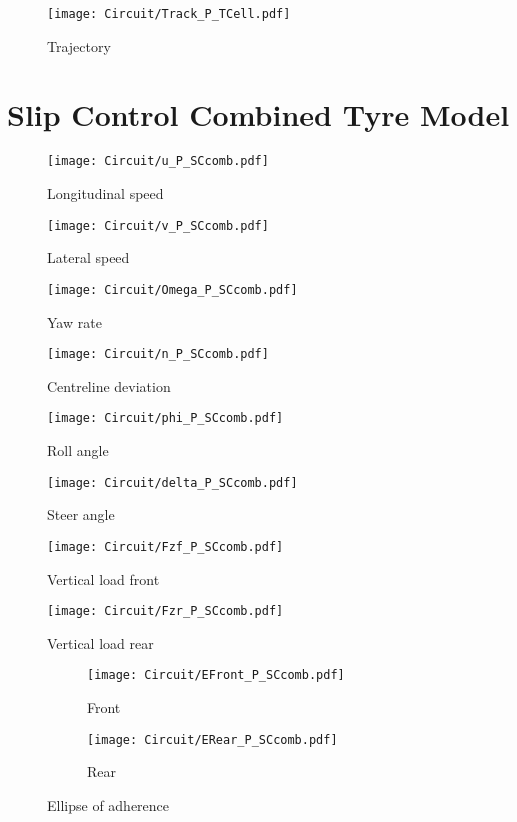 %
%
\begin{figure}[!h]
    \centering
    \texttt{[image: Circuit/Track\_P\_TCell.pdf]}
    \caption{Trajectory}
    \label{fig:TrajTCE}
\end{figure}
%
\clearpage
%
\section{Slip Control Combined Tyre Model}
%
\begin{figure}[!h]
    \centering
    \texttt{[image: Circuit/u\_P\_SCcomb.pdf]}
    \caption{Longitudinal speed}
    \label{fig:uSCC}
\end{figure}
%
\begin{figure}[!h]
    \centering
    \texttt{[image: Circuit/v\_P\_SCcomb.pdf]}
    \caption{Lateral speed}
    \label{fig:vSCC}
\end{figure}
%
\begin{figure}[!h]
    \centering
    \texttt{[image: Circuit/Omega\_P\_SCcomb.pdf]}
    \caption{Yaw rate}
    \label{fig:OmegaSCC}
\end{figure}
%
\begin{figure}[!h]
    \centering
    \texttt{[image: Circuit/n\_P\_SCcomb.pdf]}
    \caption{Centreline deviation}
    \label{fig:nSCC}
\end{figure}
%
\begin{figure}[!h]
    \centering
    \texttt{[image: Circuit/phi\_P\_SCcomb.pdf]}
    \caption{Roll angle}
    \label{fig:phiSCC}
\end{figure}
%
\begin{figure}[!h]
    \centering
    \texttt{[image: Circuit/delta\_P\_SCcomb.pdf]}
    \caption{Steer angle}
    \label{fig:deltaSCC}
\end{figure}
%
\begin{figure}[!h]
    \centering
    \texttt{[image: Circuit/Fzf\_P\_SCcomb.pdf]}
    \caption{Vertical load front}
    \label{fig:FZFSCC}
\end{figure}
%
\begin{figure}[!h]
    \centering
    \texttt{[image: Circuit/Fzr\_P\_SCcomb.pdf]}
    \caption{Vertical load rear}
    \label{fig:FZFSCC}
\end{figure}
%
\begin{figure}[!h]
    \begin{subfigure}{0.5\linewidth}
        \texttt{[image: Circuit/EFront\_P\_SCcomb.pdf]}
        \caption{Front}
        \label{fig:FESCC}
    \end{subfigure}%
    \begin{subfigure}{0.5\linewidth}
        \texttt{[image: Circuit/ERear\_P\_SCcomb.pdf]}
        \caption{Rear}
        \label{fig:RESCC}
    \end{subfigure}
    \caption{Ellipse of adherence}
\end{figure}
